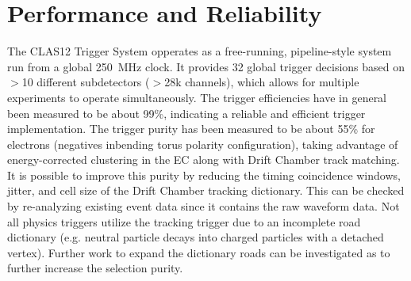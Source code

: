 \section{Performance and Reliability}

The CLAS12 Trigger System opperates as a free-running, pipeline-style system run from a global 250~MHz clock. It provides 32 global trigger decisions based on $>$10 different subdetectors ($>$28k channels), which allows for multiple experiments to operate simultaneously. The trigger efficiencies have in general been measured to be about 99\%, indicating a reliable and efficient trigger implementation. The trigger purity has been measured to be about 55\% for electrons (negatives inbending torus polarity configuration), taking advantage of energy-corrected clustering in the EC along with Drift Chamber track matching. It is possible to improve this purity by reducing the timing coincidence windows, jitter, and cell size of the Drift Chamber tracking dictionary. This can be checked by re-analyzing existing event data since it contains the raw waveform data. Not all physics triggers utilize the tracking trigger due to an incomplete road dictionary (e.g. neutral particle decays into charged particles with a detached vertex). Further work to expand the dictionary roads can be investigated as to further increase the selection purity.
